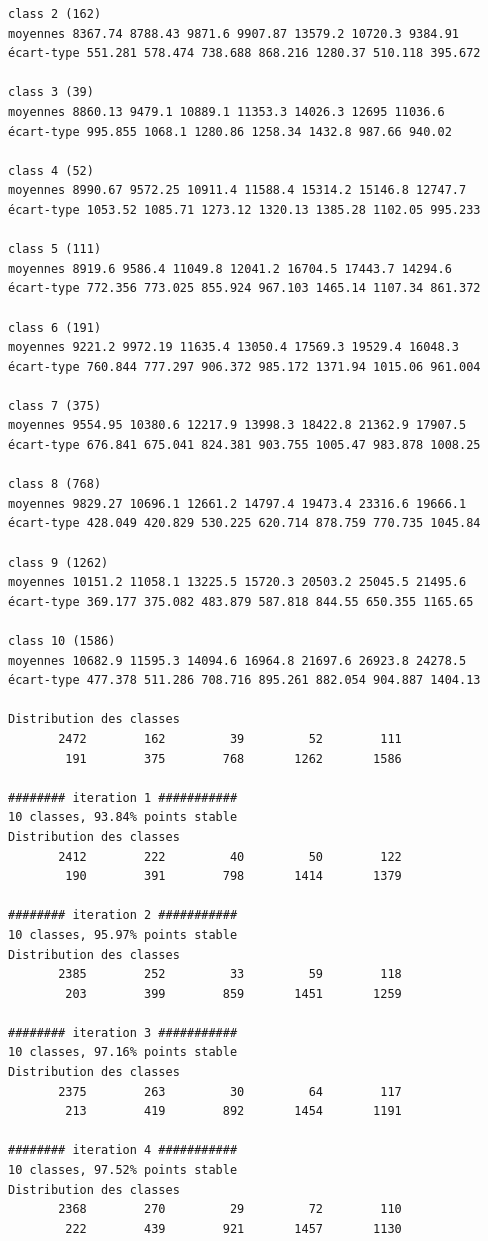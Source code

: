 \documentclass[land,article,submit,pdftex,moreauthors]{Definitions/mdpi}
\begin{document}
\begin{scriptsize}
\begin{verbatim}
class 2 (162)
moyennes 8367.74 8788.43 9871.6 9907.87 13579.2 10720.3 9384.91
écart-type 551.281 578.474 738.688 868.216 1280.37 510.118 395.672

class 3 (39)
moyennes 8860.13 9479.1 10889.1 11353.3 14026.3 12695 11036.6
écart-type 995.855 1068.1 1280.86 1258.34 1432.8 987.66 940.02

class 4 (52)
moyennes 8990.67 9572.25 10911.4 11588.4 15314.2 15146.8 12747.7
écart-type 1053.52 1085.71 1273.12 1320.13 1385.28 1102.05 995.233

class 5 (111)
moyennes 8919.6 9586.4 11049.8 12041.2 16704.5 17443.7 14294.6
écart-type 772.356 773.025 855.924 967.103 1465.14 1107.34 861.372

class 6 (191)
moyennes 9221.2 9972.19 11635.4 13050.4 17569.3 19529.4 16048.3
écart-type 760.844 777.297 906.372 985.172 1371.94 1015.06 961.004

class 7 (375)
moyennes 9554.95 10380.6 12217.9 13998.3 18422.8 21362.9 17907.5
écart-type 676.841 675.041 824.381 903.755 1005.47 983.878 1008.25

class 8 (768)
moyennes 9829.27 10696.1 12661.2 14797.4 19473.4 23316.6 19666.1
écart-type 428.049 420.829 530.225 620.714 878.759 770.735 1045.84

class 9 (1262)
moyennes 10151.2 11058.1 13225.5 15720.3 20503.2 25045.5 21495.6
écart-type 369.177 375.082 483.879 587.818 844.55 650.355 1165.65

class 10 (1586)
moyennes 10682.9 11595.3 14094.6 16964.8 21697.6 26923.8 24278.5
écart-type 477.378 511.286 708.716 895.261 882.054 904.887 1404.13

Distribution des classes
       2472        162         39         52        111
        191        375        768       1262       1586

######## iteration 1 ###########
10 classes, 93.84% points stable
Distribution des classes
       2412        222         40         50        122
        190        391        798       1414       1379

######## iteration 2 ###########
10 classes, 95.97% points stable
Distribution des classes
       2385        252         33         59        118
        203        399        859       1451       1259

######## iteration 3 ###########
10 classes, 97.16% points stable
Distribution des classes
       2375        263         30         64        117
        213        419        892       1454       1191

######## iteration 4 ###########
10 classes, 97.52% points stable
Distribution des classes
       2368        270         29         72        110
        222        439        921       1457       1130


\end{verbatim}
\end{scriptsize}
\end{document}
